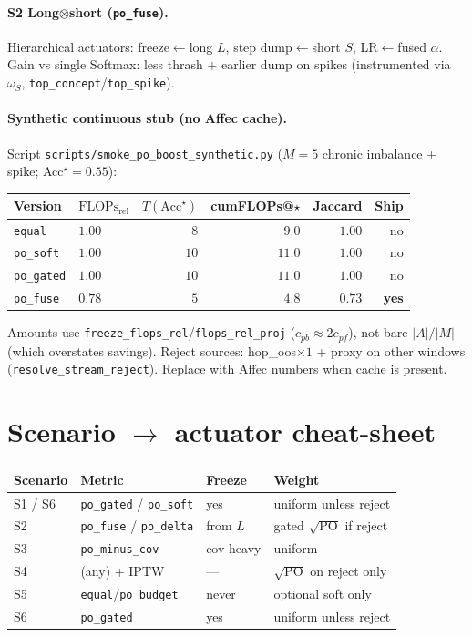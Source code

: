 \documentclass[11pt]{article}
\newcommand{\PO}{\mathrm{PO}}
\newcommand{\Flops}{\mathrm{FLOPs}_{\mathrm{rel}}}
\newcommand{\Acc}{\mathrm{Acc}}
\begin{document}
\paragraph{S2 Long$\otimes$short (\texttt{po\_fuse}).}
Hierarchical actuators: freeze$\leftarrow$long $L$,
step dump$\leftarrow$short $S$, LR$\leftarrow$fused $\alpha$.
Gain vs single Softmax: less thrash + earlier dump on spikes
(instrumented via $\omega_S$, \texttt{top\_concept}/\texttt{top\_spike}).

\paragraph{Synthetic continuous stub (no Affec cache).}
Script \texttt{scripts/smoke\_po\_boost\_synthetic.py}
($M{=}5$ chronic imbalance + spike; Acc$^\star{=}0.55$):
\begin{center}
\small
\begin{tabular}{@{}llrrrr@{}}
\toprule
Version & $\Flops$ & $T(\Acc^\star)$ & cumFLOPs@$\star$ & Jaccard & Ship \\
\midrule
\texttt{equal} & $1.00$ & $8$ & $9.0$ & $1.00$ & no \\
\texttt{po\_soft} & $1.00$ & $10$ & $11.0$ & $1.00$ & no \\
\texttt{po\_gated} & $1.00$ & $10$ & $11.0$ & $1.00$ & no \\
\texttt{po\_fuse} & $0.78$ & $5$ & $4.8$ & $0.73$ & \textbf{yes} \\
\bottomrule
\end{tabular}
\end{center}
Amounts use \texttt{freeze\_flops\_rel}/\texttt{flops\_rel\_proj}
($c_{pb}{\approx}2c_{pf}$), not bare $|A|/|M|$
(which overstates savings).
Reject sources: hop\_oos$\times1$ + proxy on other windows
(\texttt{resolve\_stream\_reject}).
Replace with Affec numbers when cache is present.

\section{Scenario $\to$ actuator cheat-sheet}
\label{sec:cheat}

\begin{center}
\small
\begin{tabular}{@{}llll@{}}
\toprule
Scenario & Metric & Freeze & Weight \\
\midrule
S1 / S6 & \texttt{po\_gated} / \texttt{po\_soft}
  & yes & uniform unless reject \\
S2 & \texttt{po\_fuse} / \texttt{po\_delta}
  & from $L$ & gated $\sqrt{\PO}$ if reject \\
S3 & \texttt{po\_minus\_cov}
  & cov-heavy & uniform \\
S4 & (any) + IPTW
  & --- & $\sqrt{\PO}$ on reject only \\
S5 & \texttt{equal}/\texttt{po\_budget}
  & never & optional soft only \\
S6 & \texttt{po\_gated}
  & yes & uniform unless reject \\
\bottomrule
\end{tabular}
\end{center}
\end{document}
